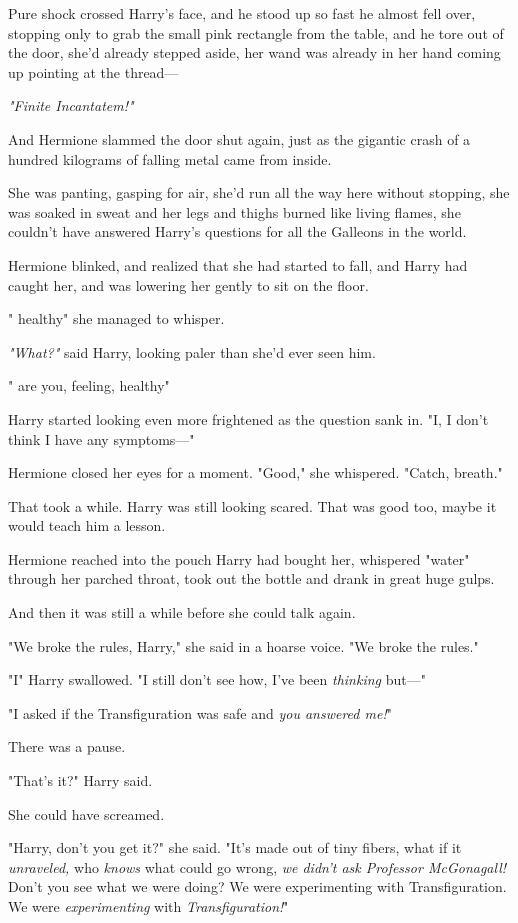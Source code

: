 Pure shock crossed Harry's face, and he stood up so fast he almost fell over,
stopping only to grab the small pink rectangle from the table, and he tore out
of the door, she'd already stepped aside, her wand was already in her hand
coming up pointing at the thread\mbox{---}

\emph{"Finite Incantatem!"}

And Hermione slammed the door shut again, just as the gigantic crash of a
hundred kilograms of falling metal came from inside.

She was panting, gasping for air, she'd run all the way here without stopping,
she was soaked in sweat and her legs and thighs burned like living flames, she
couldn't have answered Harry's questions for all the Galleons in the world.

Hermione blinked, and realized that she had started to fall, and Harry had
caught her, and was lowering her gently to sit on the floor.

"{\el} healthy{\el}" she managed to whisper.

\emph{"What?"} said Harry, looking paler than she'd ever seen him.

"{\el} are you, feeling, healthy{\el}"

Harry started looking even more frightened as the question sank in. "I, I don't
think I have any symptoms\mbox{---}"

Hermione closed her eyes for a moment. "Good," she whispered. "Catch, breath."

That took a while. Harry was still looking scared. That was good too, maybe it
would teach him a lesson.

Hermione reached into the pouch Harry had bought her, whispered "water" through
her parched throat, took out the bottle and drank in great huge gulps.

And then it was still a while before she could talk again.

"We broke the rules, Harry," she said in a hoarse voice. "We broke the rules."

"I{\el}" Harry swallowed. "I still don't see how, I've been \emph{thinking}
but\mbox{---}"

"I asked if the Transfiguration was safe and \emph{you answered me!}"

There was a pause.

"That's it?" Harry said.

She could have screamed.

"Harry, don't you get it?" she said. "It's made out of tiny fibers, what if it
\emph{unraveled,} who \emph{knows} what could go wrong, \emph{we didn't ask
Professor McGonagall!} Don't you see what we were doing? We were experimenting
with Transfiguration. We were \emph{experimenting} with \emph{Transfiguration!}"

